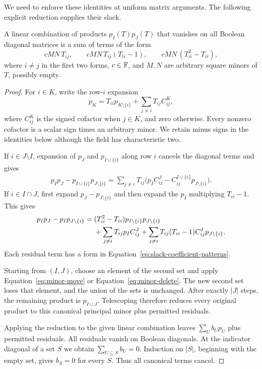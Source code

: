 We need to enforce these identities at uniform matrix arguments.
The following explicit reduction supplies their slack.

\begin{lemma}\label{lem:minor-product-slack}
A linear combination of products $p_I(T)p_J(T)$ that vanishes on all
Boolean diagonal matrices is a sum of terms of the form
\begin{equation}\label{eq:slack-coefficient-patterns}
 cMN\,T_{ij},\qquad
 cMN\,T_{ij}(T_{ii}-1),\qquad
 cMN\,(T_{ii}^2-T_{ii}),
\end{equation}
where $i\ne j$ in the first two forms, $c\in\mathbb F$, and $M,N$ are
arbitrary square minors of $T$, possibly empty.
\end{lemma}

\begin{proof}
For $i\in K$, write the row-$i$ expansion
\[
 p_K=T_{ii}p_{K\setminus\{i\}}+
       \sum_{j\ne i}T_{ij}C^K_{ij},
\]
where $C^K_{ij}$ is the signed cofactor when $j\in K$, and zero
otherwise. Every nonzero cofactor is a scalar sign times an arbitrary
minor. We retain minus signs in the identities below although the
field has characteristic two.

If $i\in J\setminus I$, expansion of $p_J$ and $p_{I\cup\{i\}}$
along row $i$ cancels the diagonal terms and gives
\begin{align}
 p_Ip_J-p_{I\cup\{i\}}p_{J\setminus\{i\}}
 =\sum_{j\ne i}T_{ij}
 \bigl(p_I C^J_{ij}
       -C^{I\cup\{i\}}_{ij}p_{J\setminus\{i\}}\bigr).
 \label{eq:minor-move}
\end{align}
If $i\in I\cap J$, first expand $p_J-p_{J\setminus\{i\}}$ and then
expand the $p_I$ multiplying $T_{ii}-1$. This gives
\begin{align}
 p_Ip_J-p_Ip_{J\setminus\{i\}}
 ={}&(T_{ii}^2-T_{ii})
       p_{I\setminus\{i\}}p_{J\setminus\{i\}}\notag\\
 &+\sum_{j\ne i}T_{ij}p_I C^J_{ij}
 +\sum_{j\ne i}T_{ij}(T_{ii}-1)
       C^I_{ij}p_{J\setminus\{i\}}.
 \label{eq:minor-delete}
\end{align}
Each residual term has a form in
Equation~\ref{eq:slack-coefficient-patterns}.

Starting from $(I,J)$, choose an element of the second set and apply
Equation~\ref{eq:minor-move} or Equation~\ref{eq:minor-delete}.
The new second set loses that element, and the union of the sets is
unchanged. After exactly $|J|$ steps, the remaining product is
$p_{I\cup J}$. Telescoping therefore reduces every original product to
this canonical principal minor plus permitted residuals.

Applying the reduction to the given linear combination leaves
$\sum_U b_U p_U$ plus permitted residuals. All residuals vanish on
Boolean diagonals. At the indicator diagonal of a set $S$ we obtain
$\sum_{U\subseteq S}b_U=0$. Induction on $|S|$, beginning with the
empty set, gives $b_S=0$ for every $S$. Thus all canonical terms
cancel.
\end{proof}

